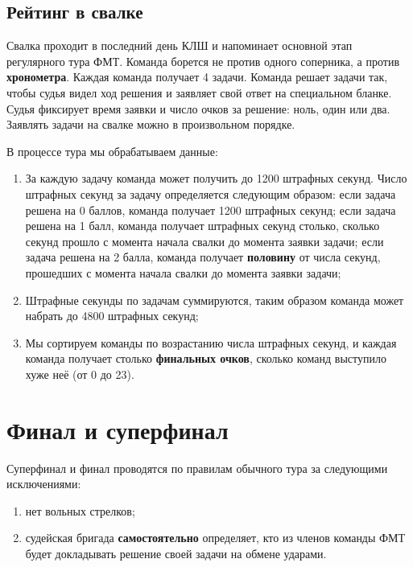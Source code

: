 \documentclass[12pt,a4paper]{article}
\begin{document}
\subsection{Рейтинг в свалке}
Свалка проходит в последний день КЛШ и напоминает основной этап регулярного тура ФМТ. Команда борется не против одного соперника, а против {\bf хронометра}. Каждая команда получает 4 задачи. Команда решает задачи так, чтобы судья видел ход решения и заявляет свой ответ на специальном бланке. Судья фиксирует время заявки и число очков за решение: ноль, один или два. Заявлять задачи на свалке можно в произвольном порядке.

В процессе тура мы обрабатываем данные:
\begin{enumerate}
	\item За каждую задачу команда может получить до 1200 штрафных секунд. Число штрафных секунд за задачу определяется следующим образом: если задача решена на 0 баллов, команда получает 1200 штрафных секунд; если задача решена на 1 балл, команда получает штрафных секунд столько, сколько секунд прошло с момента начала свалки до момента заявки задачи; если задача решена на 2 балла, команда получает {\bf половину} от числа секунд, прошедших с момента начала свалки до момента заявки задачи;
	\item Штрафные секунды по задачам суммируются, таким образом команда может набрать до 4800 штрафных секунд;
	\item Мы сортируем команды по возрастанию числа штрафных секунд, и каждая команда получает столько {\bf финальных очков}, сколько команд выступило хуже неё (от 0 до 23).
\end{enumerate}


\section{Финал и суперфинал}
Суперфинал и финал проводятся по правилам обычного тура за следующими исключениями:
\begin{enumerate}
\item нет вольных стрелков;
\item судейская бригада {\bf самостоятельно} определяет, кто из членов команды ФМТ будет докладывать решение своей задачи на обмене ударами.
\end{enumerate}

\clearpage
\end{document}
